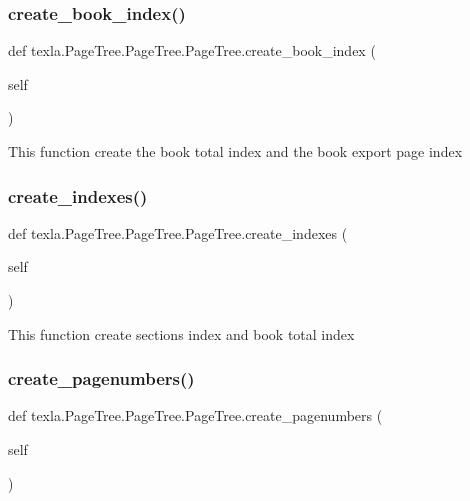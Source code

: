 \subsubsection{\texorpdfstring{create\+\_\+book\+\_\+index()}{create\_book\_index()}}
{\footnotesize\ttfamily def texla.\+Page\+Tree.\+Page\+Tree.\+Page\+Tree.\+create\+\_\+book\+\_\+index (\begin{DoxyParamCaption}\item[{}]{self }\end{DoxyParamCaption})}

\begin{DoxyVerb}This function create the book total index
and the book export page index\end{DoxyVerb}
 \hypertarget{classtexla_1_1PageTree_1_1PageTree_1_1PageTree_ae836d3ae69f72eca37fd306e64baba50}{}\label{classtexla_1_1PageTree_1_1PageTree_1_1PageTree_ae836d3ae69f72eca37fd306e64baba50} 
\subsubsection{\texorpdfstring{create\+\_\+indexes()}{create\_indexes()}}
{\footnotesize\ttfamily def texla.\+Page\+Tree.\+Page\+Tree.\+Page\+Tree.\+create\+\_\+indexes (\begin{DoxyParamCaption}\item[{}]{self }\end{DoxyParamCaption})}

\begin{DoxyVerb}This function create sections index and
book total index\end{DoxyVerb}
 \hypertarget{classtexla_1_1PageTree_1_1PageTree_1_1PageTree_ac21290653e2f62b62d23d61ad0f856bd}{}\label{classtexla_1_1PageTree_1_1PageTree_1_1PageTree_ac21290653e2f62b62d23d61ad0f856bd} 
\subsubsection{\texorpdfstring{create\+\_\+pagenumbers()}{create\_pagenumbers()}}
{\footnotesize\ttfamily def texla.\+Page\+Tree.\+Page\+Tree.\+Page\+Tree.\+create\+\_\+pagenumbers (\begin{DoxyParamCaption}\item[{}]{self }\end{DoxyParamCaption})}

